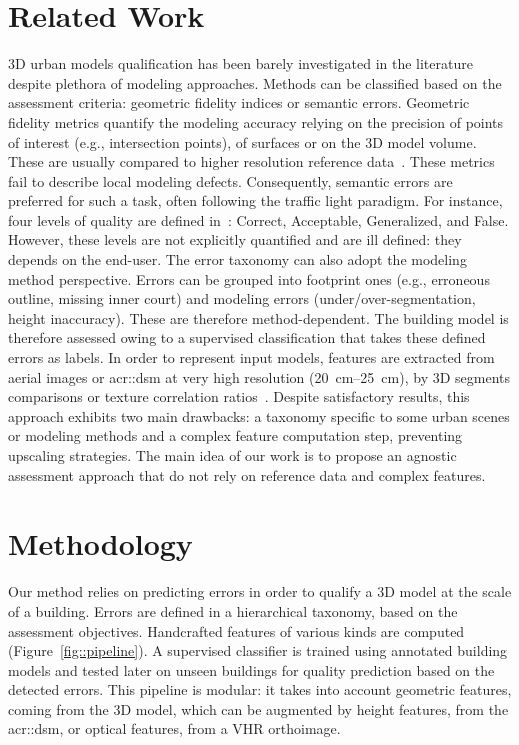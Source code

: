 \documentclass[conference]{IEEEtran}
\begin{document}
\section{Related Work}
\label{sec:related}
	3D urban models qualification has been barely investigated in the literature despite plethora of modeling approaches. Methods can be classified based on the assessment criteria: geometric fidelity indices or semantic errors. Geometric fidelity metrics quantify the modeling accuracy relying on the precision of points of interest (e.g., intersection points), of surfaces or on the 3D model volume. These are usually compared to higher resolution reference data~\cite{Kaartinen2005,Zeng2014}. These metrics fail to describe local modeling defects. Consequently, semantic errors are preferred for such a task, often following the traffic light paradigm. For instance, four levels of quality are defined in~\cite{boudet2006supervised}: Correct, Acceptable, Generalized, and False. However, these levels are not explicitly quantified and are ill defined: they depends on the end-user. The error taxonomy can also adopt the modeling method perspective. Errors can be grouped into footprint ones (e.g., erroneous outline, missing inner court) and modeling errors (under/over-segmentation, height inaccuracy). These are therefore method-dependent. The building model is therefore assessed owing to a supervised classification that takes these defined errors as labels. In order to represent input models, features are extracted from aerial images or \acrfull{acr::dsm} at very high resolution (\SIrange{20}{25}{\cm}), by 3D segments comparisons or texture correlation ratios~\cite{Michelin2013,boudet2006supervised}. Despite satisfactory results, this approach exhibits two main drawbacks: a taxonomy specific to some urban scenes or modeling methods and a complex feature computation step, preventing upscaling strategies. The main idea of our work is to propose an agnostic assessment approach that do not rely on reference data and complex features.

\section{Methodology}
\label{sec:approach}

Our method relies on predicting errors in order to qualify a 3D model at the scale of a building. Errors are defined in a hierarchical taxonomy, based on the assessment objectives. Handcrafted features of various kinds are computed (Figure~\ref{fig::pipeline}). A supervised classifier is trained using annotated building models and tested later on unseen buildings for quality prediction based on the detected errors. This pipeline is modular: it takes into account geometric features, coming from the 3D model, which can be augmented by height features, from the \acrshort{acr::dsm}, or optical features, from a VHR orthoimage.
\end{document}

